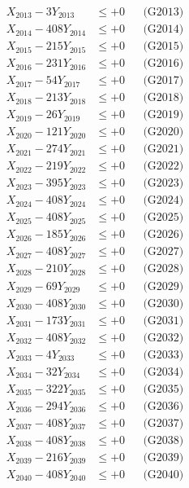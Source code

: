 \documentclass[a4paper,10pt]{article}
\begin{document}
{\begin{align}
X_{2013} - 3Y_{2013} &\leq +0 && \text{(G2013)} \\
X_{2014} - 408Y_{2014} &\leq +0 && \text{(G2014)} \\
X_{2015} - 215Y_{2015} &\leq +0 && \text{(G2015)} \\
X_{2016} - 231Y_{2016} &\leq +0 && \text{(G2016)} \\
X_{2017} - 54Y_{2017} &\leq +0 && \text{(G2017)} \\
X_{2018} - 213Y_{2018} &\leq +0 && \text{(G2018)} \\
X_{2019} - 26Y_{2019} &\leq +0 && \text{(G2019)} \\
X_{2020} - 121Y_{2020} &\leq +0 && \text{(G2020)} \\
\allowbreak
X_{2021} - 274Y_{2021} &\leq +0 && \text{(G2021)} \\
X_{2022} - 219Y_{2022} &\leq +0 && \text{(G2022)} \\
X_{2023} - 395Y_{2023} &\leq +0 && \text{(G2023)} \\
X_{2024} - 408Y_{2024} &\leq +0 && \text{(G2024)} \\
X_{2025} - 408Y_{2025} &\leq +0 && \text{(G2025)} \\
X_{2026} - 185Y_{2026} &\leq +0 && \text{(G2026)} \\
X_{2027} - 408Y_{2027} &\leq +0 && \text{(G2027)} \\
X_{2028} - 210Y_{2028} &\leq +0 && \text{(G2028)} \\
X_{2029} - 69Y_{2029} &\leq +0 && \text{(G2029)} \\
X_{2030} - 408Y_{2030} &\leq +0 && \text{(G2030)} \\
\allowbreak
X_{2031} - 173Y_{2031} &\leq +0 && \text{(G2031)} \\
X_{2032} - 408Y_{2032} &\leq +0 && \text{(G2032)} \\
X_{2033} - 4Y_{2033} &\leq +0 && \text{(G2033)} \\
X_{2034} - 32Y_{2034} &\leq +0 && \text{(G2034)} \\
X_{2035} - 322Y_{2035} &\leq +0 && \text{(G2035)} \\
X_{2036} - 294Y_{2036} &\leq +0 && \text{(G2036)} \\
X_{2037} - 408Y_{2037} &\leq +0 && \text{(G2037)} \\
X_{2038} - 408Y_{2038} &\leq +0 && \text{(G2038)} \\
X_{2039} - 216Y_{2039} &\leq +0 && \text{(G2039)} \\
X_{2040} - 408Y_{2040} &\leq +0 && \text{(G2040)} \\

\end{align}}
\end{document}
